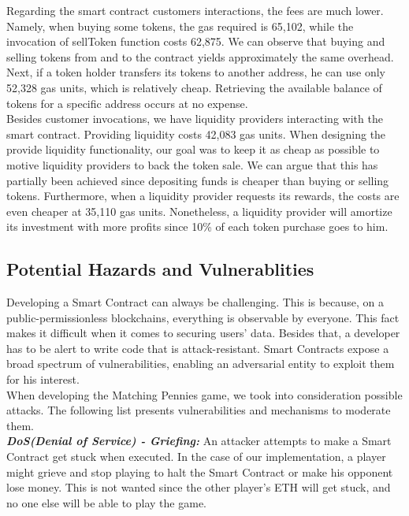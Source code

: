 \documentclass[12pt,a4paper]{article}
\begin{document}
Regarding the smart contract customers interactions, the fees are much lower.
Namely, when buying some tokens, the gas required is 65,102, while the
invocation of sellToken function costs 62,875. We can observe that buying and
selling tokens from and to the contract yields approximately the same overhead.
Next, if a token holder transfers its tokens to another address, he can use only
52,328 gas units, which is relatively cheap. Retrieving the available balance of
tokens for a specific address occurs at no expense. \\

Besides customer invocations, we have liquidity providers interacting with the
smart contract. Providing liquidity costs 42,083 gas units. When designing the
provide liquidity functionality, our goal was to keep it as cheap as possible to
motive liquidity providers to back the token sale. We can argue that this has
partially been achieved since depositing funds is cheaper than buying or selling
tokens. Furthermore, when a liquidity provider requests its rewards, the costs
are even cheaper at 35,110 gas units. Nonetheless, a liquidity provider will
amortize its investment with more profits since 10\% of each token purchase goes
to him. 

\subsection*{Potential Hazards and Vulnerablities}

Developing a Smart Contract can always be challenging. This is because, on a public-permissionless blockchains, everything is observable by everyone. This fact makes it difficult when it comes to securing users’ data. Besides that, a developer has to be alert to write code that is attack-resistant. Smart Contracts expose a broad spectrum of vulnerabilities, enabling an adversarial entity to exploit them for his interest.\\

When developing the Matching Pennies game, we took into consideration possible attacks.
The following list presents vulnerabilities and mechanisms to moderate them. \\

\textbf{\emph{DoS(Denial of Service) - Griefing: }}An attacker attempts to make a Smart Contract get stuck when executed. In the case of our implementation, a player might grieve and stop playing to halt the Smart Contract or make his opponent lose money. This is not wanted since the other player’s ETH will get stuck, and no one else will be able to play the game. \\
\end{document}
